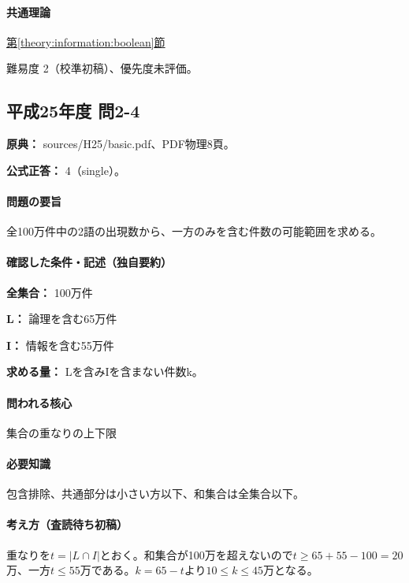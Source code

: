 \paragraph{共通理論} \hyperref[theory:information:boolean]{第\ref*{theory:information:boolean}節}

\par 難易度 2（校準初稿）、優先度未評価。

\subsection{平成25年度 問2-4}
\label{q:h25-reg-basic-2-4}

\noindent\textbf{原典：} sources/H25/basic.pdf、PDF物理8頁。

\textbf{公式正答：} 4（single）。

\paragraph{問題の要旨} 全100万件中の2語の出現数から、一方のみを含む件数の可能範囲を求める。

\paragraph{確認した条件・記述（独自要約）}\mbox{}\par

\noindent\textbf{全集合：} 100万件\par

\noindent\textbf{L：} 論理を含む65万件\par

\noindent\textbf{I：} 情報を含む55万件\par

\noindent\textbf{求める量：} Lを含みIを含まない件数k。\par

\paragraph{問われる核心} 集合の重なりの上下限

\paragraph{必要知識} 包含排除、共通部分は小さい方以下、和集合は全集合以下。

\paragraph{考え方（査読待ち初稿）} 重なりを\(t=|L\cap I|\)とおく。和集合が100万を超えないので\(t\ge65+55-100=20\)万、一方\(t\le55\)万である。\(k=65-t\)より\(10\le k\le45\)万となる。

